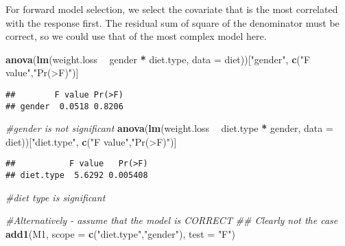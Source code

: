 \documentclass[]{book}
\newenvironment{Shaded}{\begin{snugshade}}{\end{snugshade}}
\newcommand{\CommentTok}[1]{\textcolor[rgb]{0.56,0.35,0.01}{\textit{#1}}}
\newcommand{\DataTypeTok}[1]{\textcolor[rgb]{0.13,0.29,0.53}{#1}}
\newcommand{\DecValTok}[1]{\textcolor[rgb]{0.00,0.00,0.81}{#1}}
\newcommand{\KeywordTok}[1]{\textcolor[rgb]{0.13,0.29,0.53}{\textbf{#1}}}
\newcommand{\NormalTok}[1]{#1}
\newcommand{\OperatorTok}[1]{\textcolor[rgb]{0.81,0.36,0.00}{\textbf{#1}}}
\newcommand{\StringTok}[1]{\textcolor[rgb]{0.31,0.60,0.02}{#1}}
\theoremstyle{definition}
\theoremstyle{definition}
\theoremstyle{definition}
\theoremstyle{remark}
\begin{document}
\begin{Shaded}
\end{Shaded}

For forward model selection, we select the covariate that is the most
correlated with the response first. The residual sum of square of the
denominator must be correct, so we could use that of the most complex
model here.

\begin{Shaded}
\begin{Highlighting}[]
\KeywordTok{anova}\NormalTok{(}\KeywordTok{lm}\NormalTok{(weight.loss }\OperatorTok{~}\StringTok{ }\NormalTok{gender }\OperatorTok{*}\StringTok{ }\NormalTok{diet.type, }\DataTypeTok{data =}\NormalTok{ diet))[}\StringTok{"gender"}\NormalTok{, }\KeywordTok{c}\NormalTok{(}\StringTok{"F value"}\NormalTok{,}\StringTok{"Pr(>F)"}\NormalTok{)] }
\end{Highlighting}
\end{Shaded}

\begin{verbatim}
##        F value Pr(>F)
## gender  0.0518 0.8206
\end{verbatim}

\begin{Shaded}
\begin{Highlighting}[]
\CommentTok{#gender is not significant}
\KeywordTok{anova}\NormalTok{(}\KeywordTok{lm}\NormalTok{(weight.loss }\OperatorTok{~}\StringTok{ }\NormalTok{diet.type }\OperatorTok{*}\StringTok{ }\NormalTok{gender, }\DataTypeTok{data =}\NormalTok{ diet))[}\StringTok{"diet.type"}\NormalTok{, }\KeywordTok{c}\NormalTok{(}\StringTok{"F value"}\NormalTok{,}\StringTok{"Pr(>F)"}\NormalTok{)] }
\end{Highlighting}
\end{Shaded}

\begin{verbatim}
##           F value   Pr(>F)
## diet.type  5.6292 0.005408
\end{verbatim}

\begin{Shaded}
\begin{Highlighting}[]
\CommentTok{#diet type is significant}

\CommentTok{#Alternatively - assume that the model is CORRECT}
\CommentTok{## Clearly not the case}
\KeywordTok{add1}\NormalTok{(M1, }\DataTypeTok{scope =} \KeywordTok{c}\NormalTok{(}\StringTok{"diet.type"}\NormalTok{,}\StringTok{"gender"}\NormalTok{), }\DataTypeTok{test =} \StringTok{"F"}\NormalTok{)}
\end{Highlighting}
\end{Shaded}
\end{document}
